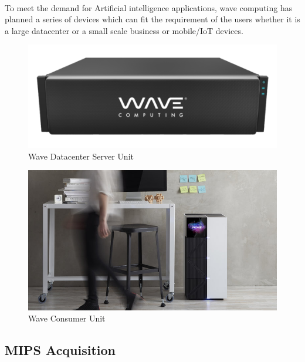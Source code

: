 \paragraph{}
To meet the demand for Artificial intelligence applications, wave computing has planned a series of devices which can fit the requirement of the users whether it is a large datacenter or a small scale business or mobile/{IoT} devices.
\begin{figure}[H]
    \centering
    \includegraphics[trim=0cm 0cm 0cm 0cm, clip=true,scale=0.5]{figures/wave_server.png}
    \caption{Wave Datacenter Server Unit\label{Fig:waveserver}}\vspace{-4mm}
    \end{figure}

\begin{figure}[H]
    \centering
    \includegraphics[trim=0cm 0cm 0cm 0cm, clip=true,scale=1]{figures/wave_lab.jpg}
    \caption{Wave Consumer Unit\label{Fig:wavelab}}\vspace{-4mm}
    \end{figure}

\subsection*{MIPS Acquisition}

